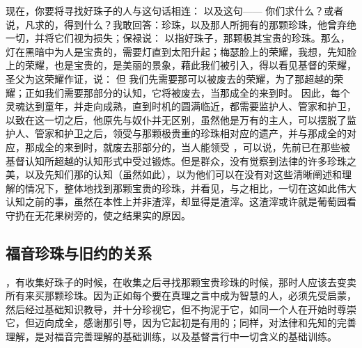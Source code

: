 现在，你要将寻找好珠子的人与这句话相连：  以及这句——  你们求什么？或者说，凡求的，得到什么？我敢回答：珍珠，以及那人所拥有的那颗珍珠，他曾弃绝一切，并将它们视为损失；保禄说：  以指好珠子，那颗极其宝贵的珍珠。那么，灯在黑暗中为人是宝贵的，需要灯直到太阳升起；梅瑟脸上的荣耀，我想，先知脸上的荣耀，也是宝贵的，是美丽的景象，藉此我们被引入，得以看见基督的荣耀，圣父为这荣耀作证，说：  但  我们先需要那可以被废去的荣耀，为了那超越的荣耀；正如我们需要那部分的认知，它将被废去，当那成全的来到时。 因此，每个灵魂达到童年，并走向成熟，直到时机的圆满临近，都需要监护人、管家和护卫，以致在这一切之后，他原先与奴仆并无区别，虽然他是万有的主人，可以摆脱了监护人、管家和护卫之后，领受与那颗极贵重的珍珠相对应的遗产，并与那成全的对应，那成全的来到时，就废去那部分的，当人能领受 ，可以说，先前已在那些被基督认知所超越的认知形式中受过锻炼。但是群众，没有觉察到法律的许多珍珠之美，以及先知们那的认知（虽然如此），以为他们可以在没有对这些清晰阐述和理解的情况下，整体地找到那颗宝贵的珍珠，并看见，与之相比，一切在这如此伟大认知之前的事，虽然在本性上并非渣滓，却显得是渣滓。这渣滓或许就是葡萄园看守扔在无花果树旁的，使之结果实的原因。\par


\subsection{福音珍珠与旧约的关系}

 ，有收集好珠子的时候，在收集之后寻找那颗宝贵珍珠的时候，那时人应该去变卖所有来买那颗珍珠。因为正如每个要在真理之言中成为智慧的人，必须先受启蒙，然后经过基础知识教导，并十分珍视它，但不拘泥于它，如同一个人在开始时尊崇它，但迈向成全，感谢那引导，因为它起初是有用的；同样，对法律和先知的完善理解，是对福音完善理解的基础训练，以及基督言行中一切含义的基础训练。\par


